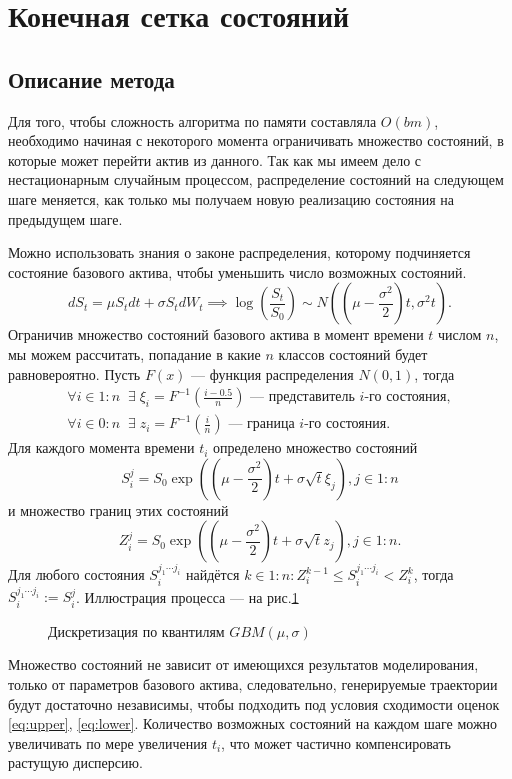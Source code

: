 \section{Конечная сетка состояний}
	    \subsection{Описание метода}
	        Для того, чтобы сложность алгоритма по  памяти составляла $O(bm)$, необходимо начиная с некоторого момента ограничивать множество состояний, в которые может перейти актив из данного. Так как мы имеем дело с нестационарным случайным процессом, распределение состояний на следующем шаге меняется, как только мы получаем новую реализацию состояния на предыдущем шаге.

	        Можно использовать знания о законе распределения, которому подчиняется состояние базового актива, чтобы уменьшить число возможных состояний.
	        $$dS_t = \mu S_t dt + \sigma S_t dW_t \implies \log \left(\frac{S_t}{S_0}\right)\sim N\left(\left(\mu - \frac{\sigma^2}{2}\right)t, \sigma^2 t\right).$$
	        Ограничив множество состояний базового актива в момент времени $t$ числом $n$, мы можем рассчитать, попадание в какие $n$ классов состояний будет равновероятно. Пусть $F(x)$ --- функция распределения $N\left(0, 1\right)$, тогда
	        \begin{align}
	            \forall i \in 1:n \;\;\exists\; \xi_i = F^{-1}\left(\frac{i-0.5}{n}\right) \text{ --- представитель $i$-го состояния} ,\\
	            \forall i \in 0:n \;\;\exists\; z_i = F^{-1}\left(\frac{i}{n}\right) \text{ --- граница $i$-го состояния} .
	        \end{align}
	        Для каждого момента времени $t_i$ определено множество состояний $$S_i^j = S_0\exp\left(\left(\mu - \frac{\sigma^2}{2}\right)t + \sigma \sqrt{t}\xi_j\right), j\in 1:n$$ и множество границ этих состояний $$Z_i^j = S_0\exp\left(\left(\mu - \frac{\sigma^2}{2}\right)t + \sigma \sqrt{t}z_j\right), j\in 1:n.$$
	        Для любого состояния $S_i^{j_1\cdots j_i}$ найдётся $k\in 1:n : Z_i^{k-1} \leq S_i^{j_1\cdots j_i} < Z_i^k$, тогда $S_i^{j_1\cdots j_i} := S_i^j$. Иллюстрация процесса --- на рис.\ref{fig:grid}
	        \begin{figure}[h]
        	    \centering
        		\caption{Дискретизация по квантилям $GBM(\mu, \sigma)$}
        		\label{fig:grid}
        	\end{figure}
	        Множество состояний не зависит от имеющихся результатов моделирования, только от параметров базового актива, следовательно, генерируемые траектории будут достаточно независимы, чтобы подходить под условия сходимости оценок \eqref{eq:upper}, \eqref{eq:lower}. Количество возможных состояний на каждом шаге можно увеличивать по мере увеличения $t_i$, что может частично компенсировать растущую дисперсию.
